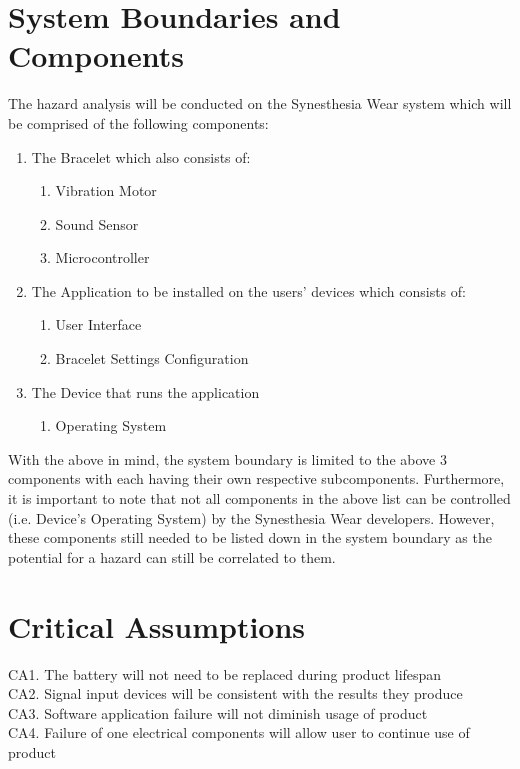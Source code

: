 \documentclass{article}
\begin{document}
\section{System Boundaries and Components}
The hazard analysis will be conducted on the Synesthesia Wear system which will be 
comprised of the following components:
\begin{enumerate}
    \item The Bracelet which also consists of:
    \begin{enumerate}
        \item Vibration Motor
        \item Sound Sensor
        \item Microcontroller
    \end{enumerate}
    \item The Application to be installed on the users' devices which consists of:
    \begin{enumerate}
        \item User Interface
        \item Bracelet Settings Configuration
    \end{enumerate}
    \item The Device that runs the application
    \begin{enumerate}
        \item Operating System
    \end{enumerate}
\end{enumerate}

With the above in mind, the system boundary is limited to the above 3 components with 
each having their own respective subcomponents. Furthermore, it is important to note 
that not all components in the above list can be controlled (i.e. Device's Operating 
System) by the Synesthesia Wear developers. However, these components still needed to 
be listed down in the system boundary as the potential for a hazard can still be 
correlated to them.

\section{Critical Assumptions}

CA1. The battery will not need to be replaced during product lifespan
\\CA2. Signal input devices will be consistent with the results they produce
\\CA3. Software application failure will not diminish usage of product 
\\CA4. Failure of one electrical components will allow user to continue use of product
\end{document}
